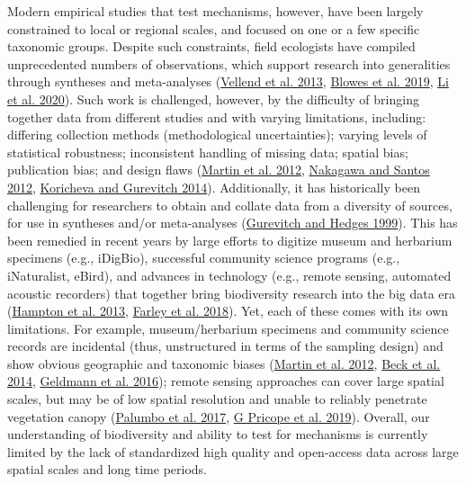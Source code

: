 \documentclass[
  12pt,
]{article}
\begin{document}
Modern empirical studies that test mechanisms, however, have been largely constrained to local or regional scales, and focused on one or a few specific taxonomic groups. Despite such constraints, field ecologists have compiled unprecedented numbers of observations, which support research into generalities through syntheses and meta-analyses (\protect\hyperlink{ref-vellend2013global}{Vellend et al. 2013}, \protect\hyperlink{ref-blowes2019geography}{Blowes et al. 2019}, \protect\hyperlink{ref-li2020changes}{Li et al. 2020}). Such work is challenged, however, by the difficulty of bringing together data from different studies and with varying limitations, including: differing collection methods (methodological uncertainties); varying levels of statistical robustness; inconsistent handling of missing data; spatial bias; publication bias; and design flaws (\protect\hyperlink{ref-martin2012mapping}{Martin et al. 2012}, \protect\hyperlink{ref-nakagawa2012methodological}{Nakagawa and Santos 2012}, \protect\hyperlink{ref-koricheva2014uses}{Koricheva and Gurevitch 2014}). Additionally, it has historically been challenging for researchers to obtain and collate data from a diversity of sources, for use in syntheses and/or meta-analyses (\protect\hyperlink{ref-gurevitch1999statistical}{Gurevitch and Hedges 1999}). This has been remedied in recent years by large efforts to digitize museum and herbarium specimens (e.g., iDigBio), successful community science programs (e.g., iNaturalist, eBird), and advances in technology (e.g., remote sensing, automated acoustic recorders) that together bring biodiversity research into the big data era (\protect\hyperlink{ref-hampton2013big}{Hampton et al. 2013}, \protect\hyperlink{ref-farley2018situating}{Farley et al. 2018}). Yet, each of these comes with its own limitations. For example, museum/herbarium specimens and community science records are incidental (thus, unstructured in terms of the sampling design) and show obvious geographic and taxonomic biases (\protect\hyperlink{ref-martin2012mapping}{Martin et al. 2012}, \protect\hyperlink{ref-beck2014spatial}{Beck et al. 2014}, \protect\hyperlink{ref-geldmann2016determines}{Geldmann et al. 2016}); remote sensing approaches can cover large spatial scales, but may be of low spatial resolution and unable to reliably penetrate vegetation canopy (\protect\hyperlink{ref-palumbo2017building}{Palumbo et al. 2017}, \protect\hyperlink{ref-g2019remote}{G Pricope et al. 2019}). Overall, our understanding of biodiversity and ability to test for mechanisms is currently limited by the lack of standardized high quality and open-access data across large spatial scales and long time periods.
\end{document}

